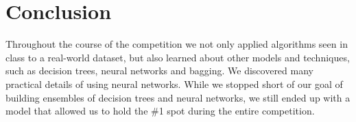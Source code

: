 \documentclass[10pt,conference,compsocconf]{IEEEtran}
\begin{document}
\section{Conclusion}

Throughout the course of the competition we not only applied algorithms seen in class to a real-world dataset, but also learned about other models and techniques, such as decision trees, neural networks and bagging. We  discovered many practical details of using neural networks.
While we stopped short of our goal of building ensembles of decision trees and neural networks, we still ended up with a model that allowed us to hold the \#1 spot during the entire competition.



\end{document}
